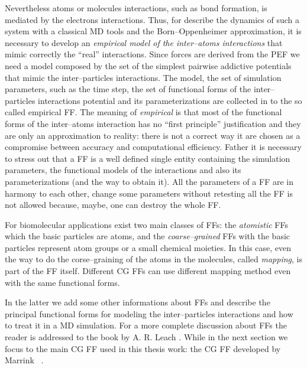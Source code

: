 Nevertheless atoms or molecules interactions, such as bond formation, is mediated by the electrons interactions. Thus, for describe the dynamics of such a system with a classical \ac{MD} tools and the Born--Oppenheimer approximation, it is necessary to develop an \textit{empirical model of the inter--atoms interactions} that mimic correctly the ``real'' interactions. Since forces are derived from the \ac{PEF} we need a model composed by the set of the simplest pairwise addictive potentials that mimic the inter--particles interactions. The model, the set of simulation parameters, such as the time step, the set of functional forms of the inter--particles interactions potential and its parameterizations are collected in to the so called empirical \acf{FF}. The meaning of \textit{empirical} is that most of the functional forms of the inter--atoms interaction has no ``first principle'' justification and they are only an approximation to reality: there is not a correct way it are chosen as a compromise between accuracy and computational efficiency. Father it is necessary to stress out that a \ac{FF} is a well defined single entity containing the simulation parameters, the functional models of the interactions and also its parameterizations (and the way to obtain it). All the parameters of a \ac{FF} are in harmony to each other, change some parameters without retesting all the \ac{FF} is not allowed because, maybe, one can destroy the whole \ac{FF}.

For biomolecular applications exist two main classes of \acp{FF}: the \textit{atomistic} \acp{FF} which the basic particles are atoms, and the \textit{coarse--grained} \acp{FF} with the basic particles represent atom groups or a small chemical moieties. In this case, even the way to do the corse--graining of the atoms in the molecules, called \textit{mapping}, is part of the \ac{FF} itself. Different \ac{CG} \acp{FF} can use different mapping method even with the same functional forms.

In the latter we add some other informations about \acp{FF} and describe the principal functional forms for modeling the inter--particles interactions and how to treat it in a \ac{MD} simulation. For a more complete discussion about \acp{FF} the reader is addressed to the book by A. R. Leach \cite{Leach}. While in the next section we focus to the main \ac{CG} \ac{FF} used in this thesis work: the  \ac{CG} \ac{FF} developed by Marrink \etal\, \cite{Martini}.

